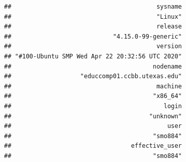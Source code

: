 \documentclass[]{article}
\begin{document}
\begin{verbatim}
##                                        sysname 
##                                        "Linux" 
##                                        release 
##                            "4.15.0-99-generic" 
##                                        version 
## "#100-Ubuntu SMP Wed Apr 22 20:32:56 UTC 2020" 
##                                       nodename 
##                   "educcomp01.ccbb.utexas.edu" 
##                                        machine 
##                                       "x86_64" 
##                                          login 
##                                      "unknown" 
##                                           user 
##                                       "smo884" 
##                                 effective_user 
##                                       "smo884"
\end{verbatim}
\end{document}
